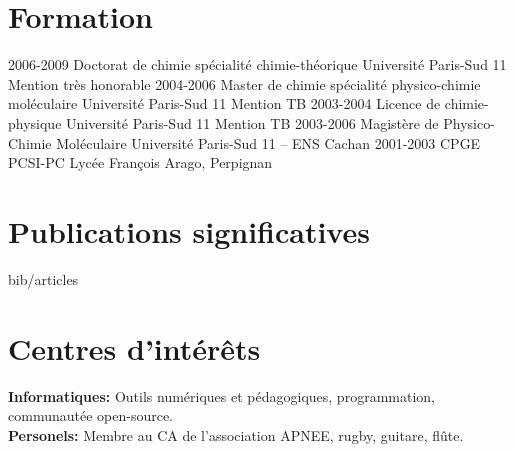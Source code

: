 \documentclass[french]{cv-style}      %
\begin{document}

\section{Formation}

\begin{entrylist}
\entry
{2006-2009}
{Doctorat de chimie {\normalfont spécialité chimie-théorique}}
{Université Paris-Sud 11}
{Mention très honorable}
\entry
{2004-2006}
{Master de chimie {\normalfont spécialité physico-chimie moléculaire}}
{Université Paris-Sud 11}
{Mention TB}
\entry
{2003-2004}
{Licence de chimie-physique}
{Université Paris-Sud 11}
{Mention TB}
\entry
{2003-2006}
{Magistère de Physico-Chimie Moléculaire}
{Université Paris-Sud 11 -- ENS Cachan}
{}
\entry
{2001-2003}
{CPGE {\normalfont PCSI-PC}}
{Lycée François Arago, Perpignan}
{}
\end{entrylist}


\section{Publications significatives}

\nocite{vallverdu2016, guille2015, Guille2014, Martin2012, Maillet2011, Vallverdu2010}
\begin{btSect}{bib/articles}
    \btPrintCited
\end{btSect}


\section{Centres d'intérêts}
  \vspace{-0.2cm}

\textbf{Informatiques:} Outils numériques et pédagogiques, programmation,
communautée open-source.\\
\textbf{Personels:} Membre au CA de l'association APNEE, rugby, guitare, flûte.

\end{document}
